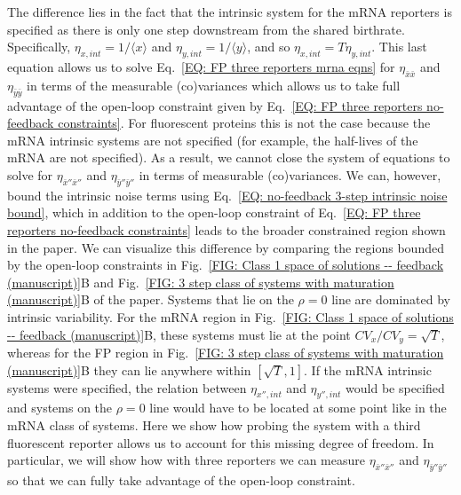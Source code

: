 \documentclass[%
 reprint,prx,
superscriptaddress,
%
%
%
%
%
%
%
%
%
 amsmath,amssymb,
 aps,
%
%
%
%
%
%
]{revtex4-2}
\begin{document}
{{The difference lies in the fact that the intrinsic system for the mRNA reporters is specified as there is only one step downstream from the shared birthrate. Specifically, $\eta_{x,int} = 1/\langle x \rangle$ and $\eta_{y,int} = 1/\langle y \rangle$, and so $\eta_{x,int} = T\eta_{y,int}$. This last equation allows us to solve Eq.~\eqref{EQ: FP three reporters mrna eqns} for $\eta_{\bar{x}\bar{x}}$ and $\eta_{\bar{y}\bar{y}}$ in terms of the measurable (co)variances which allows us to take full advantage of the open-loop constraint given by Eq.~\eqref{EQ: FP three reporters no-feedback constraints}. For fluorescent proteins this is not the case because the mRNA intrinsic systems are not specified (for example, the half-lives of the mRNA are not specified). As a result, we cannot close the system of equations to solve for $\eta_{\bar{x}''\bar{x}''}$ and $\eta_{\bar{y}''\bar{y}''}$ in terms of measurable (co)variances. We can, however, bound the intrinsic noise terms using Eq.~\eqref{EQ: no-feedback 3-step intrinsic noise bound}, which in addition to the open-loop constraint of Eq.~\eqref{EQ: FP three reporters no-feedback constraints} leads to the broader constrained region shown in the paper. We can visualize this difference by comparing the regions bounded by the open-loop constraints in Fig.~\ref{FIG: Class 1 space of solutions -- feedback (manuscript)}B and Fig.~\ref{FIG: 3 step class of systems with maturation (manuscript)}B of the paper. Systems that lie on the $\rho = 0$ line are dominated by intrinsic variability. For the mRNA region in Fig.~\ref{FIG: Class 1 space of solutions -- feedback (manuscript)}B, these systems must lie at the point $CV_{x}/CV_{y} = \sqrt{T}$, whereas for the FP region in Fig.~\ref{FIG: 3 step class of systems with maturation (manuscript)}B they can lie anywhere within $[ \sqrt{T},1 ]$. If the mRNA intrinsic systems were specified, the relation between $\eta_{x'',int}$ and $\eta_{y'',int}$ would be specified and systems on the $\rho = 0$ line would have to be located at some point like in the mRNA class of systems. Here we show how probing the system with a third fluorescent reporter allows us to account for this missing degree of freedom. In particular, we will show how with three reporters we can measure $\eta_{\bar{x}''\bar{x}''}$ and $\eta_{\bar{y}''\bar{y}''}$ so that we can fully take advantage of the open-loop constraint. 

}}
\end{document}
